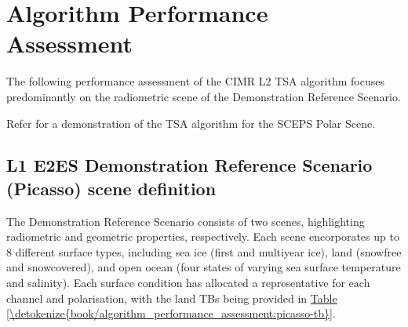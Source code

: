 \documentclass[letterpaper,10pt,english]{jupyterBook}
\begin{document}
\sphinxstepscope


\chapter{Algorithm Performance Assessment}
\label{\detokenize{book/algorithm_performance_assessment:algorithm-performance-assessment}}\label{\detokenize{book/algorithm_performance_assessment::doc}}
\sphinxAtStartPar
The following performance assessment of the CIMR L2 TSA algorithm focuses predominantly on the radiometric scene of the Demonstration Reference Scenario.


\nopagebreak


\sphinxAtStartPar
Refer  for a demonstration of the TSA algorithm for the SCEPS Polar Scene.




\section{L1 E2ES Demonstration Reference Scenario (Picasso) scene definition}
\label{\detokenize{book/algorithm_performance_assessment:l1-e2es-demonstration-reference-scenario-picasso-scene-definition}}
\sphinxAtStartPar
The Demonstration Reference Scenario consists of two scenes, highlighting radiometric and geometric properties, respectively.
Each scene encorporates up to 8 different surface types, including sea ice (first and multi\sphinxhyphen{}year ice), land (snow\sphinxhyphen{}free and snow\sphinxhyphen{}covered), and open ocean (four states of varying sea surface temperature and salinity).
Each surface condition has allocated a representative {\hyperref[\detokenize{book/acronyms:term-TB}]{}} for each {\hyperref[\detokenize{book/acronyms:term-CIMR}]{}} channel and polarisation, with the land TBs being provided in \hyperref[\detokenize{book/algorithm_performance_assessment:picasso-tb}]{Table \ref{\detokenize{book/algorithm_performance_assessment:picasso-tb}}}.
\end{document}
